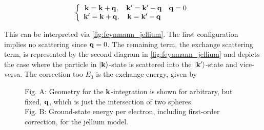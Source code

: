\documentclass{homework}
\begin{document}
\begin{equation}
    \left\{\begin{array}{ccc}
        {\bf k} = {\bf k} + {\bf q,} & {\bf k}' = {\bf k}' - {\bf q} & {\bf q} = 0 \\
        {\bf k}' = {\bf k} + {\bf q}, & {\bf k} = {\bf k}' - {\bf q}
    \end{array} \right.
\end{equation}

This can be interpreted via \cref{fig:feynmann_jellium}. The first configuration implies no scattering since ${\bf q} = 0$. The remaining term, the exchange scattering term, is represented by the second diagram in \cref{fig:feynmann_jellium} and depicts the case where the particle in $\ket{{\bf k}}$-state is scattered into the $\ket{{\bf k}'}$-state and vice-versa. The correction too $E_0$ is the exchange energy, given by 

\begin{figure}
    \centering
    \qquad
    \caption{Fig. A: Geometry for the ${\bf k}$-integration is shown for arbitrary, but fixed, ${\bf q}$, which is just the intersection of two spheres. \\
    Fig. B: Ground-state energy per electron, including first-order correction, for the jellium model.}
    \label{figs:jellium}
\end{figure}
\end{document}
